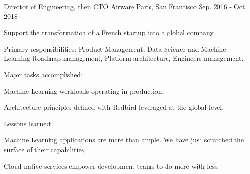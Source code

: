 \begin{cventries}
  \cventry
    {Director of Engineering, then CTO} %
    {Airware} %
    {Paris, San Francisco} %
    {Sep. 2016 - Oct. 2018} %
    {
      \begin{cvitems} %
        \item {Support the transformation of a French startup into a global company.}
        \item {Primary responsibilities: Product Management, Data Science and Machine Learning Roadmap management, Platform architecture, Engineers management.}
        \item {Major tasks accomplished:}
        \begin{cvsubitems}
          \item {Machine Learning workloads operating in production,}
          \item {Architecture principles defined with Redbird leveraged at the global level.}
        \end{cvsubitems}
        \item {Lessons learned:}
        \begin{cvsubitems}
          \item {Machine Learning applications are more than ample. We have just scratched the surface of their capabilities,}
          \item {Cloud-native services empower development teams to do more with less.}
        \end{cvsubitems}
      \end{cvitems}
    }


\end{cventries}
